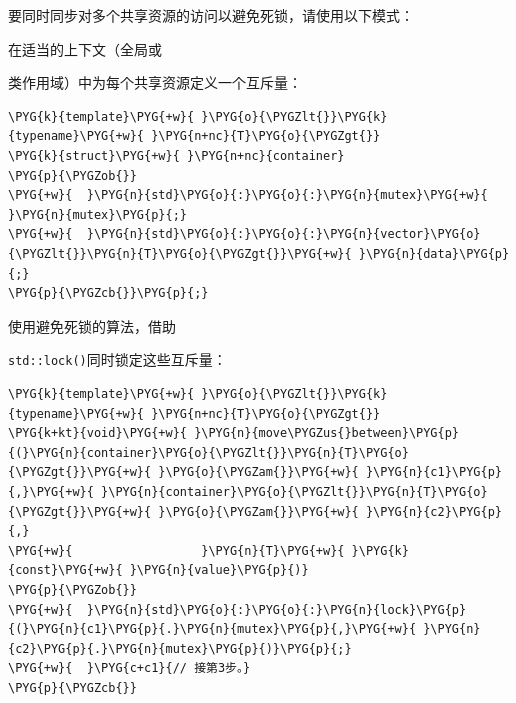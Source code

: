 
要同时同步对多个共享资源的访问以避免死锁，请使用以下模式：



在适当的上下文（全局或



类作用域）中为每个共享资源定义一个互斥量：



\begin{codeblockbg}
\begin{Verbatim}[commandchars=\\\{\},breaklines=true,breakanywhere=true,fontsize=\codefont,xleftmargin=17bp]
\PYG{k}{template}\PYG{+w}{ }\PYG{o}{\PYGZlt{}}\PYG{k}{typename}\PYG{+w}{ }\PYG{n+nc}{T}\PYG{o}{\PYGZgt{}}
\PYG{k}{struct}\PYG{+w}{ }\PYG{n+nc}{container}
\PYG{p}{\PYGZob{}}
\PYG{+w}{  }\PYG{n}{std}\PYG{o}{:}\PYG{o}{:}\PYG{n}{mutex}\PYG{+w}{     }\PYG{n}{mutex}\PYG{p}{;}
\PYG{+w}{  }\PYG{n}{std}\PYG{o}{:}\PYG{o}{:}\PYG{n}{vector}\PYG{o}{\PYGZlt{}}\PYG{n}{T}\PYG{o}{\PYGZgt{}}\PYG{+w}{ }\PYG{n}{data}\PYG{p}{;}
\PYG{p}{\PYGZcb{}}\PYG{p}{;}
\end{Verbatim}
\end{codeblockbg}



使用避免死锁的算法，借助



\texttt{std::\allowbreak{}lock()}同时锁定这些互斥量：



\begin{codeblockbg}
\begin{Verbatim}[commandchars=\\\{\},breaklines=true,breakanywhere=true,fontsize=\codefont,xleftmargin=17bp]
\PYG{k}{template}\PYG{+w}{ }\PYG{o}{\PYGZlt{}}\PYG{k}{typename}\PYG{+w}{ }\PYG{n+nc}{T}\PYG{o}{\PYGZgt{}}
\PYG{k+kt}{void}\PYG{+w}{ }\PYG{n}{move\PYGZus{}between}\PYG{p}{(}\PYG{n}{container}\PYG{o}{\PYGZlt{}}\PYG{n}{T}\PYG{o}{\PYGZgt{}}\PYG{+w}{ }\PYG{o}{\PYGZam{}}\PYG{+w}{ }\PYG{n}{c1}\PYG{p}{,}\PYG{+w}{ }\PYG{n}{container}\PYG{o}{\PYGZlt{}}\PYG{n}{T}\PYG{o}{\PYGZgt{}}\PYG{+w}{ }\PYG{o}{\PYGZam{}}\PYG{+w}{ }\PYG{n}{c2}\PYG{p}{,}
\PYG{+w}{                  }\PYG{n}{T}\PYG{+w}{ }\PYG{k}{const}\PYG{+w}{ }\PYG{n}{value}\PYG{p}{)}
\PYG{p}{\PYGZob{}}
\PYG{+w}{  }\PYG{n}{std}\PYG{o}{:}\PYG{o}{:}\PYG{n}{lock}\PYG{p}{(}\PYG{n}{c1}\PYG{p}{.}\PYG{n}{mutex}\PYG{p}{,}\PYG{+w}{ }\PYG{n}{c2}\PYG{p}{.}\PYG{n}{mutex}\PYG{p}{)}\PYG{p}{;}
\PYG{+w}{  }\PYG{c+c1}{// 接第3步。}
\PYG{p}{\PYGZcb{}}
\end{Verbatim}
\end{codeblockbg}


